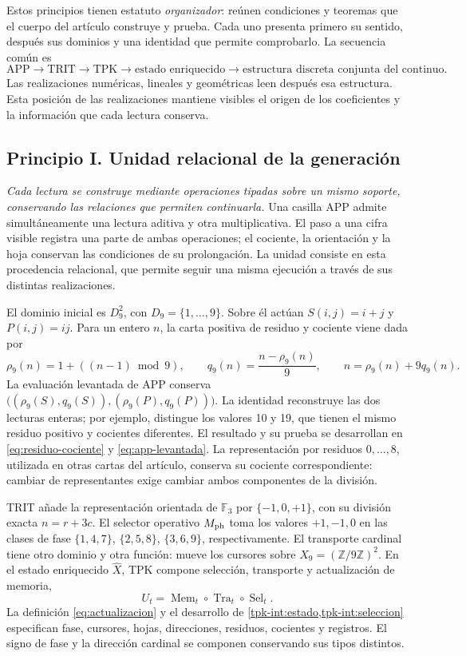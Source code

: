 Estos principios tienen estatuto \emph{organizador}: reúnen condiciones y
teoremas que el cuerpo del artículo construye y prueba. Cada uno presenta primero
su sentido, después sus dominios y una identidad que permite comprobarlo.
La secuencia común es
\[
 \mathrm{APP}\longrightarrow\mathrm{TRIT}\longrightarrow\mathrm{TPK}
 \longrightarrow\text{estado enriquecido}
 \longrightarrow\text{estructura discreta conjunta del continuo}.
\]
Las realizaciones numéricas, lineales y geométricas leen después esa
estructura. Esta posición de las realizaciones mantiene visibles el origen
de los coeficientes y la información que cada lectura conserva.

\subsection*{Principio I. Unidad relacional de la generación}
\hypertarget{prinh:unidad}{}

\emph{Cada lectura se construye mediante operaciones tipadas sobre un
mismo soporte, conservando las relaciones que permiten continuarla.} Una
casilla APP admite simultáneamente una lectura aditiva y otra multiplicativa.
El paso a una cifra visible registra una parte de ambas operaciones; el
cociente, la orientación y la hoja conservan las condiciones de su
prolongación. La unidad consiste en esta procedencia relacional, que permite
seguir una misma ejecución a través de sus distintas realizaciones.

El dominio inicial es \(D_9^2\), con \(D_9=\{1,\ldots,9\}\). Sobre él
actúan \(S(i,j)=i+j\) y \(P(i,j)=ij\). Para un entero \(n\), la carta
positiva de residuo y cociente viene dada por
\[
 \rho_9(n)=1+((n-1)\bmod9),\qquad
 q_9(n)=\frac{n-\rho_9(n)}9,\qquad
 n=\rho_9(n)+9q_9(n).
\]
La evaluación levantada de APP conserva
\(\bigl((\rho_9(S),q_9(S)),(\rho_9(P),q_9(P))\bigr)\).
La identidad reconstruye las dos lecturas enteras; por ejemplo, distingue
los valores 10 y 19, que tienen el mismo residuo positivo y cocientes
diferentes. El resultado y su prueba se desarrollan en
\eqref{eq:residuo-cociente} y \eqref{eq:app-levantada}. La representación
por residuos \(0,\ldots,8\), utilizada en otras cartas del artículo, conserva
su cociente correspondiente: cambiar de representantes exige cambiar ambos
componentes de la división.

TRIT añade la representación orientada de \(\mathbb F_3\) por
\(\{-1,0,+1\}\), con su división exacta \(n=r+3c\). El selector operativo
\(M_{\rm ph}\) toma los valores \(+1,-1,0\) en las clases de fase
\(\{1,4,7\}\), \(\{2,5,8\}\), \(\{3,6,9\}\), respectivamente.
El transporte cardinal tiene otro dominio y otra función: mueve los
cursores sobre \(X_9=(\mathbb Z/9\mathbb Z)^2\). En el estado enriquecido
\(\widehat X\), TPK compone selección, transporte y actualización de
memoria,
\[
 U_t=\operatorname{Mem}_t\circ\operatorname{Tra}_t
                    \circ\operatorname{Sel}_t.
\]
La definición \eqref{eq:actualizacion} y el desarrollo de
\cref{tpk-int:estado,tpk-int:seleccion} especifican fase, cursores, hojas,
direcciones, residuos, cocientes y registros. El signo de fase y la dirección
cardinal se componen conservando sus tipos distintos.

